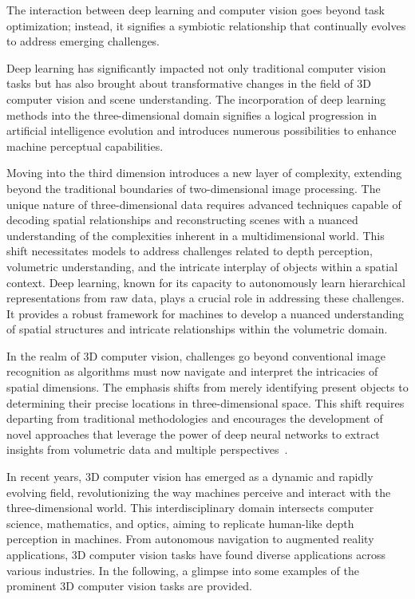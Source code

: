 The interaction between deep learning and computer vision goes beyond task optimization; instead, it signifies a symbiotic relationship that continually evolves to address emerging challenges.

Deep learning has significantly impacted not only traditional computer vision tasks but has also brought about transformative changes in the field of 3D computer vision and scene understanding. The incorporation of deep learning methods into the three-dimensional domain signifies a logical progression in artificial intelligence evolution and introduces numerous possibilities to enhance machine perceptual capabilities.

Moving into the third dimension introduces a new layer of complexity, extending beyond the traditional boundaries of two-dimensional image processing. The unique nature of three-dimensional data requires advanced techniques capable of decoding spatial relationships and reconstructing scenes with a nuanced understanding of the complexities inherent in a multidimensional world. This shift necessitates models to address challenges related to depth perception, volumetric understanding, and the intricate interplay of objects within a spatial context. Deep learning, known for its capacity to autonomously learn hierarchical representations from raw data, plays a crucial role in addressing these challenges. It provides a robust framework for machines to develop a nuanced understanding of spatial structures and intricate relationships within the volumetric domain.

In the realm of 3D computer vision, challenges go beyond conventional image recognition as algorithms must now navigate and interpret the intricacies of spatial dimensions. The emphasis shifts from merely identifying present objects to determining their precise locations in three-dimensional space. This shift requires departing from traditional methodologies and encourages the development of novel approaches that leverage the power of deep neural networks to extract insights from volumetric data and multiple perspectives~\citep{maturana2015voxnet, qi2017pointnet, li2018pointcnn}.

In recent years, 3D computer vision has emerged as a dynamic and rapidly evolving field, revolutionizing the way machines perceive and interact with the three-dimensional world. This interdisciplinary domain intersects computer science, mathematics, and optics, aiming to replicate human-like depth perception in machines. From autonomous navigation to augmented reality applications, 3D computer vision tasks have found diverse applications across various industries. In the following, a glimpse into some examples of the prominent 3D computer vision tasks are provided.

